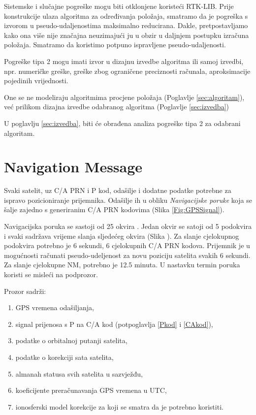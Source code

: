 \documentclass[a4paper,twoside,12pt]{memoir} %
\begin{document}
	Sistemske i slučajne pogreške mogu biti otklonjene koristeći RTK-LIB.
	 Prije konstrukcije ulaza algoritma za određivanja položaja, smatramo da je
	pogreška s izvorom u pseudo-udaljenostima maksimalno reducirana.
	Dakle, pretpostavljamo kako ona više nije značajna
	neuzimajući ju u obzir u daljnjem postupku izračuna položaja. \label{stranica:greskaOvisisamoOxOpravdano}
	Smatramo da koristimo potpuno ispravljene pseudo-udaljenosti.
	
	\vspace{0.5cm}
	Pogreške tipa 2 mogu imati izvor u dizajnu izvedbe algoritma ili samoj izvedbi, npr.
	numeričke greške, greške zbog ograničene preciznosti računala,
	aproksimacije pojedinih vrijednosti.
	
	One se ne modeliraju algoritmima procjene položaja (Poglavlje \ref{sec:algoritam}), već prilikom dizajna izvedbe odabranog algoritma (Poglavlje \ref{sec:izvedba})
	
	U poglavlju \ref{sec:izvedba}, biti će obrađena analiza pogreške tipa 2 za odabrani algoritam.
	
	\section{Navigation Message}\label{sec:NM} %
	Svaki satelit, uz C/A PRN i P kod, odašilje i dodatne podatke potrebne za ispravo pozicioniranje prijemnika. Odašilje ih u obliku \textit{Navigacijske poruke} koja se šalje zajedno s generiranim C/A PRN kodovima (Slika \ref{Fig:GPSSignal}).
	
	Navigacijska poruka se sastoji od 25 okvira \cite{bookProcessing}.
	Jedan okvir se satoji od 5 podokvira i svaki sadržava vrijeme slanja
	sljedećeg okvira (Slika \cite{GPS:1}). Za slanje cjelokupnog podokvira potrebno je 6 sekundi,
	6 cjelokupnih C/A PRN kodova. Prijemnik je u mogućnosti računati pseudo-udeljenost za novu poziciju satelita svakih
	6 sekundi.
	Za slanje cjelokupne NM, potrebno je 12.5 minuta.
	U nastavku termin poruka koristi se misleći na podprozor.
	\vspace{0.5cm}
	
	Prozor sadrži:
	\begin{enumerate}
		\item GPS vremena odašiljanja,
		\item signal prijenosa s P na C/A kod (potpoglavlja \ref{Pkod} i \ref{CAkod}),
		\item podatke o orbitalnoj putanji satelita,
		\item podatke o korekciji sata satelita,
		\item almanah statusa svih satelita u sazvježđu,
		\item koeficijente preračunavanja GPS vremena u UTC,
		\item ionosferski model korekcije za koji se smatra da je potrebno koristiti.
	\end{enumerate}
	
\end{document}

